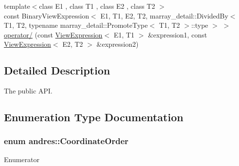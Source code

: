 \begin{DoxyCompactItemize}
\item 
{\footnotesize template$<$class E1 , class T1 , class E2 , class T2 $>$ }\\const Binary\+View\+Expression$<$ E1, T1, E2, T2, marray\+\_\+detail\+::\+Divided\+By$<$ T1, T2, typename marray\+\_\+detail\+::\+Promote\+Type$<$ T1, T2 $>$\+::type $>$ $>$ \hyperlink{namespaceandres_ae804c627d02a5db6e2e16f020dfd1683}{operator/} (const \hyperlink{classandres_1_1ViewExpression}{View\+Expression}$<$ E1, T1 $>$ \&expression1, const \hyperlink{classandres_1_1ViewExpression}{View\+Expression}$<$ E2, T2 $>$ \&expression2)
\end{DoxyCompactItemize}


\subsection{Detailed Description}
The public A\+P\+I. 

\subsection{Enumeration Type Documentation}
\hypertarget{namespaceandres_a2ac8b7aa89d44e8188a7c0ba50f4306b}{}
\subsubsection[{Coordinate\+Order}]{\setlength{\rightskip}{0pt plus 5cm}enum {\bf andres\+::\+Coordinate\+Order}}\label{namespaceandres_a2ac8b7aa89d44e8188a7c0ba50f4306b}
\begin{Desc}
\item[Enumerator]\par
\begin{description}
\item[{\em 
\hypertarget{namespaceandres_a2ac8b7aa89d44e8188a7c0ba50f4306ba88e74e8570fc8b1bee29f708f391fe69}{}First\+Major\+Order\label{namespaceandres_a2ac8b7aa89d44e8188a7c0ba50f4306ba88e74e8570fc8b1bee29f708f391fe69}
}]\item[{\em 
\hypertarget{namespaceandres_a2ac8b7aa89d44e8188a7c0ba50f4306ba586bd03d7519be47cac8605d4833b7ae}{}Last\+Major\+Order\label{namespaceandres_a2ac8b7aa89d44e8188a7c0ba50f4306ba586bd03d7519be47cac8605d4833b7ae}
}]\end{description}
\end{Desc}
\hypertarget{namespaceandres_a69f07c437d156c7028c7d619e566281f}{}

